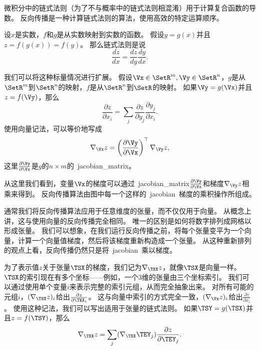 微积分中的链式法则（为了不与概率中的链式法则相混淆）用于计算复合函数的导数。
反向传播是一种计算链式法则的算法，使用高效的特定运算顺序。

设$x$是实数，$f$和$g$是从实数映射到实数的函数。
假设$y=g(x)$并且$z=f(g(x))=f(y)$。
那么链式法则是说
\begin{equation}
\frac{dz}{dx}=\frac{dz}{dy} \frac{dy}{dx}.
\label{eq:6.44}
\end{equation}

我们可以将这种标量情况进行扩展。
假设$\Vx\in \SetR^m, \Vy\in \SetR^n$，$g$是从$\SetR^m$到$\SetR^n$的映射，$f$是从$\SetR^n$到$\SetR$的映射。
如果$\Vy=g(\Vx)$并且$z=f(\Vy)$，那么
\begin{equation}
\frac{\partial z}{\partial x_i} = \sum_j \frac{\partial z}{\partial y_j} \frac{\partial y_j}{\partial x_i}.
\end{equation}
使用向量记法，可以等价地写成
\begin{equation}
\nabla_{\Vx}z = \left ( \frac{\partial \Vy}{\partial \Vx} \right )^\top \nabla_{\Vy} z,
\end{equation}
这里$\frac{\partial \Vy}{\partial \Vx}$是$g$的$n\times m$的~\gls{jacobian_matrix}。

从这里我们看到，变量$\Vx$的梯度可以通过~\gls{jacobian_matrix}$\frac{\partial \Vy}{\partial \Vx}$和梯度$\nabla_{\Vy} z$相乘来得到。
反向传播算法由图中每一个这样的~\gls{jacobian}~梯度的乘积操作所组成。


通常我们将反向传播算法应用于任意维度的张量，而不仅仅用于向量。
从概念上讲，这与使用向量的反向传播完全相同。 
唯一的区别是如何将数字排列成网格以形成张量。 
我们可以想象，在我们运行反向传播之前，将每个张量变平为一个向量，计算一个向量值梯度，然后将该梯度重新构造成一个张量。
从这种重新排列的观点上看，反向传播仍然只是将~\gls{jacobian}~乘以梯度。


为了表示值$z$关于张量$\TSX$的梯度，我们记为$\nabla_\TSX z$，就像$\TSX$是向量一样。
$\TSX$的索引现在有多个坐标——例如，一个3维的张量由三个坐标索引。
我们可以通过使用单个变量$i$来表示完整的索引元组，从而完全抽象出来。
对所有可能的元组$i$，$(\nabla_\TSX z)_i$给出$\frac{\partial z}{\partial \TEX_i}$。
这与向量中索引的方式完全一致，$(\nabla_{\Vx} z)_i$给出$\frac{\partial z}{\partial x_i}$。
使用这种记法，我们可以写出适用于张量的链式法则。
如果$\TSY=g(\TSX)$并且$z=f(\TSY)$，那么
\begin{equation}
  \nabla_\TSX z = \sum_j (\nabla_\TSX \TEY_j)\frac{\partial z}{\partial \TEY_j}.
  \label{eq:6.47}
\end{equation}

